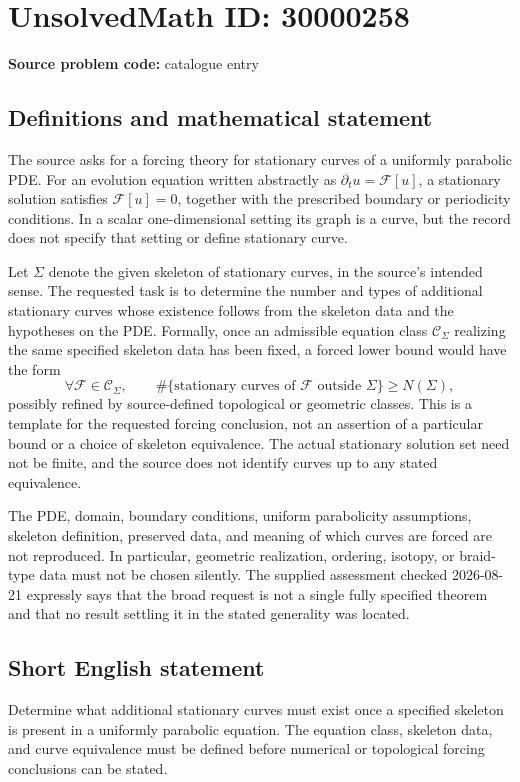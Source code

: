 \documentclass[11pt]{article}
\begin{document}
\section*{UnsolvedMath ID: 30000258}
\textbf{Source problem code:} catalogue entry
\subsection{Definitions and mathematical statement}
The source asks for a forcing theory for stationary curves of a uniformly parabolic PDE. For an evolution equation written abstractly as \(\partial_tu=\mathcal F[u]\), a stationary solution satisfies \(\mathcal F[u]=0\), together with the prescribed boundary or periodicity conditions. In a scalar one-dimensional setting its graph is a curve, but the record does not specify that setting or define stationary curve.

Let \(\Sigma\) denote the given skeleton of stationary curves, in the source's intended sense. The requested task is to determine the number and types of additional stationary curves whose existence follows from the skeleton data and the hypotheses on the PDE. Formally, once an admissible equation class \(\mathcal C_\Sigma\) realizing the same specified skeleton data has been fixed, a forced lower bound would have the form
\[
\forall\mathcal F\in\mathcal C_\Sigma,\qquad
\#\{\text{stationary curves of }\mathcal F\text{ outside }\Sigma\}\geq N(\Sigma),
\]
possibly refined by source-defined topological or geometric classes. This is a template for the requested forcing conclusion, not an assertion of a particular bound or a choice of skeleton equivalence. The actual stationary solution set need not be finite, and the source does not identify curves up to any stated equivalence.

The PDE, domain, boundary conditions, uniform parabolicity assumptions, skeleton definition, preserved data, and meaning of which curves are forced are not reproduced. In particular, geometric realization, ordering, isotopy, or braid-type data must not be chosen silently. The supplied assessment checked 2026-08-21 expressly says that the broad request is not a single fully specified theorem and that no result settling it in the stated generality was located.
\subsection{Short English statement}
Determine what additional stationary curves must exist once a specified skeleton is present in a uniformly parabolic equation. The equation class, skeleton data, and curve equivalence must be defined before numerical or topological forcing conclusions can be stated.
\end{document}
